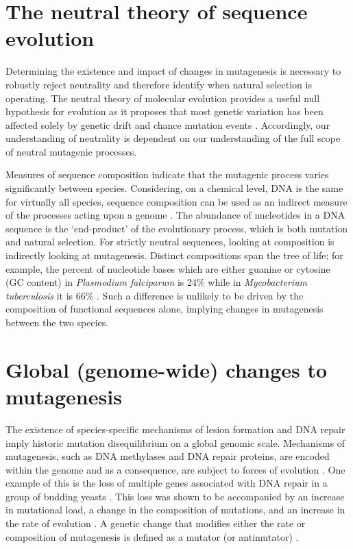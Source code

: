 \section{The neutral theory of sequence evolution}

Determining the existence and impact of changes in mutagenesis is necessary to robustly reject neutrality and therefore identify when natural selection is operating. The neutral theory of molecular evolution provides a useful null hypothesis for evolution as it proposes that most genetic variation has been affected solely by genetic drift and chance mutation events \citep{Kimura1968EvolutionaryLevel, King1969Non-DarwinianEvolution}. Accordingly, our understanding of neutrality is dependent on our understanding of the full scope of neutral mutagenic processes. 

Measures of sequence composition indicate that the mutagenic process varies significantly between species. Considering, on a chemical level, DNA is the same for virtually all species, sequence composition can be used as an indirect measure of the processes acting upon a genome \citep{Karlin1994ComparisonsSequences, Karlin1995DinucleotideSignature}. The abundance of nucleotides in a DNA sequence is the `end-product' of the evolutionary process, which is both mutation and natural selection. For strictly neutral sequences, looking at composition is indirectly looking at mutagenesis. Distinct compositions span the tree of life; for example, the percent of nucleotide bases which are either guanine or cytosine (GC content) in \textit{Plasmodium falciparum} is 24\% while in \textit{Mycobacterium tuberculosis} it is  66\% \citep{Nakamura2000Codon2000}. Such a difference is unlikely to be driven by the composition of functional sequences alone, implying changes in mutagenesis between the two species. 

\section{Global (genome-wide) changes to mutagenesis}

The existence of species-specific mechanisms of lesion formation \citep{Moore2012DNAFunction} and DNA repair \citep{Kelner1949EffectInjury} imply historic mutation disequilibrium on a global genomic scale. Mechanisms of mutagenesis, such as DNA methylases and DNA repair proteins, are encoded within the genome and as a consequence, are subject to forces of evolution \citep{Lynch2010EvolutionRate, Lynch2016GeneticRate}. One example of this is the loss of multiple genes associated with DNA repair in a group of budding yeasts \citep{Steenwyk2019ExtensiveYeasts}. This loss was shown to be accompanied by an increase in mutational load, a change in the composition of mutations, and an increase in the rate of evolution \citep{Steenwyk2019ExtensiveYeasts}. A genetic change that modifies either the rate or composition of mutagenesis is defined as a mutator (or antimutator) \citep{Lynch2016GeneticRate}. 

